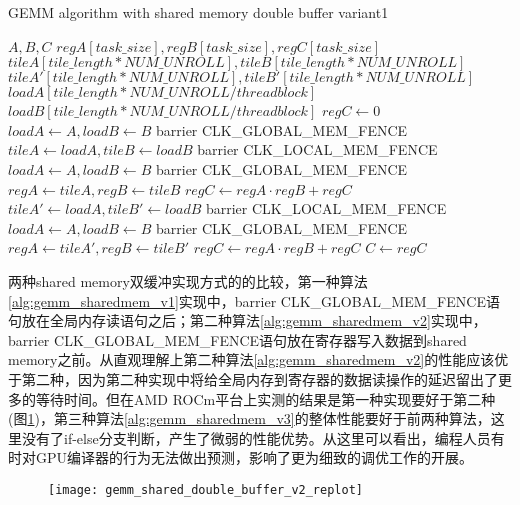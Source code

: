 \begin{algorithm}[htbp]
	\small
	\caption{GEMM algorithm with shared memory double buffer variant1}\label{alg:gemm_sharedmem_v1}
	\begin{algorithmic}[1]
		\State $A, B, C$
		\State $regA[task\_size],regB[task\_size],regC[task\_size]$
		\State $tileA[tile\_length*NUM\_UNROLL],tileB[tile\_length*NUM\_UNROLL]$
		\State $tileA'[tile\_length*NUM\_UNROLL],tileB'[tile\_length*NUM\_UNROLL]$
		\State $loadA[tile\_length*NUM\_UNROLL/threadblock]$
		\State $loadB[tile\_length*NUM\_UNROLL/threadblock]$
		\State $regC \gets 0$
		\State $loadA \gets A, loadB \gets B $
		\State barrier CLK\_GLOBAL\_MEM\_FENCE
				\State $tileA \gets loadA, tileB \gets loadB$
				\State barrier CLK\_LOCAL\_MEM\_FENCE
				\State $loadA \gets A, loadB \gets B $
				\State barrier CLK\_GLOBAL\_MEM\_FENCE
						\State $regA \gets tileA, regB \gets tileB$
						\State $regC \gets regA \cdot regB + regC$
					\EndFor
			\Else  
				\State $tileA' \gets loadA, tileB' \gets loadB$
				\State barrier CLK\_LOCAL\_MEM\_FENCE
				\State $loadA \gets A, loadB \gets B $
				\State barrier CLK\_GLOBAL\_MEM\_FENCE
						\State $regA \gets tileA', regB \gets tileB'$
						\State $regC \gets regA \cdot regB + regC$
					\EndFor
			\EndIf
		\EndFor\label{gemmendfor}
		\State $C \gets regC$
	\end{algorithmic}
\end{algorithm}
两种shared memory双缓冲实现方式的的比较，第一种算法\ref{alg:gemm_sharedmem_v1}实现中，barrier CLK\_GLOBAL\_MEM\_FENCE语句放在全局内存读语句之后；第二种算法\ref{alg:gemm_sharedmem_v2}实现中，barrier CLK\_GLOBAL\_MEM\_FENCE语句放在寄存器写入数据到shared memory之前。从直观理解上第二种算法\ref{alg:gemm_sharedmem_v2}的性能应该优于第二种，因为第二种实现中将给全局内存到寄存器的数据读操作的延迟留出了更多的等待时间。但在AMD ROCm平台上实测的结果是第一种实现要好于第二种(图\ref{fig:gemm_shared_double_buffer_v2_replot})，第三种算法\ref{alg:gemm_sharedmem_v3}的整体性能要好于前两种算法，这里没有了if-else分支判断，产生了微弱的性能优势。从这里可以看出，编程人员有时对GPU编译器的行为无法做出预测，影响了更为细致的调优工作的开展。
\begin{figure}[htbp]
	\centering
	\texttt{[image: gemm\_shared\_double\_buffer\_v2\_replot]}
	\label{fig:gemm_shared_double_buffer_v2_replot}
\end{figure}

